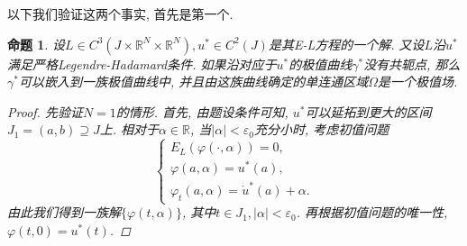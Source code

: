 \documentclass[12pt,a4paper]{article}
\newtheorem{proposition}[theorem]{命题}
\begin{document}
以下我们验证这两个事实, 首先是第一个.

\begin{proposition}\label{prop1.25}
    设$L \in C^3(J \times \mathbb{R}^N \times \mathbb{R}^N), u^* \in C^2(J)$是其E-L方程的一个解. 又设$L$沿$u^*$满足严格Legendre-Hadamard条件.
    如果沿对应于$u^*$的极值曲线$\gamma^*$没有共轭点, 那么$\gamma^*$可以嵌入到一族极值曲线中, 并且由这族曲线确定的单连通区域$\Omega$是一个极值场.
    \begin{proof}
        先验证$N = 1$的情形. 首先, 由题设条件可知, $u^*$可以延拓到更大的区间$J_1 = (a, b) \supseteq J$上.
        相对于$\alpha \in \mathbb{R}$, 当$|\alpha| < \varepsilon_0$充分小时, 考虑初值问题 
        \begin{equation*}
            \begin{cases} 
                E_L(\varphi(\cdot, \alpha)) = 0, \\  
                \varphi(a, \alpha) = u^*(a), \\  
                \varphi_t(a, \alpha) = \dot u^*(a) + \alpha. 
            \end{cases}
        \end{equation*}
        由此我们得到一族解$\{\varphi(t, \alpha)\}$, 其中$t \in J_1, |\alpha| < \varepsilon_0$.
        再根据初值问题的唯一性, $\varphi(t, 0) = u^*(t)$.


\end{proof}
\end{proposition}
\end{document}
